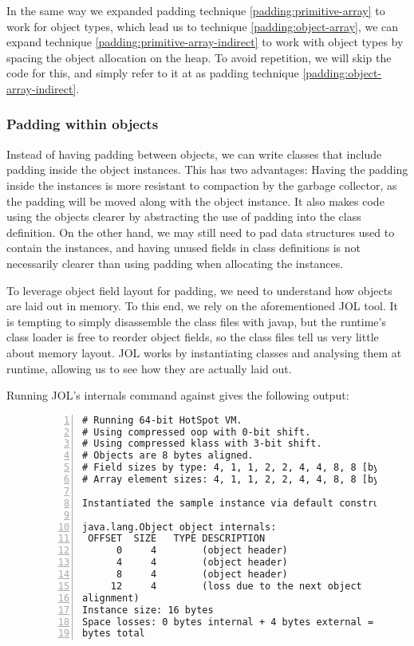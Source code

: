 In the same way we expanded padding technique \ref{padding:primitive-array} to
work for object types, which lead us to technique \ref{padding:object-array}, we
can expand technique \ref{padding:primitive-array-indirect} to work with object
types by spacing the object allocation on the heap.
\label{padding:object-array-indirect}
To avoid repetition, we will skip the code for this, and simply refer to it at
as padding technique \ref{padding:object-array-indirect}.

\subsubsection{Padding within objects}

Instead of having padding between objects, we can write classes that include
padding inside the object instances. This has two advantages: Having the
padding inside the instances is more resistant to compaction by the garbage
collector, as the padding will be moved along with the object instance. It also
makes code using the objects clearer by abstracting the use of padding into the
class definition. On the other hand, we may still need to pad data structures
used to contain the instances, and having unused fields in class definitions is
not necessarily clearer than using padding when allocating the instances.

To leverage object field layout for padding, we need to understand how
objects are laid out in memory. To this end, we rely on the aforementioned
JOL tool. It is tempting to simply disassemble the class files with
javap, but
the runtime's class loader is free to reorder object fields, so the class files
tell us very little about memory layout. JOL works by instantiating classes and
analysing them at runtime, allowing us to see how they are actually laid out.

Running JOL's internals command against  gives the
following output:

\begin{figure}[h]
\begin{Verbatim}[frame=single, numbers=left]
# Running 64-bit HotSpot VM.
# Using compressed oop with 0-bit shift.
# Using compressed klass with 3-bit shift.
# Objects are 8 bytes aligned.
# Field sizes by type: 4, 1, 1, 2, 2, 4, 4, 8, 8 [bytes]
# Array element sizes: 4, 1, 1, 2, 2, 4, 4, 8, 8 [bytes]

Instantiated the sample instance via default constructor.

java.lang.Object object internals:
 OFFSET  SIZE   TYPE DESCRIPTION
      0     4        (object header)
      4     4        (object header)
      8     4        (object header)
     12     4        (loss due to the next object
alignment)
Instance size: 16 bytes
Space losses: 0 bytes internal + 4 bytes external = 4
bytes total
\end{Verbatim}
\end{figure}

